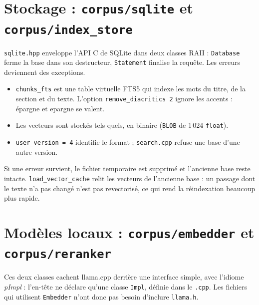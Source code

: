 \documentclass[11pt,a4paper]{article}
\newcommand{\fichier}[1]{\texttt{#1}}
\begin{document}
\section{Stockage : \texttt{corpus/sqlite} et \texttt{corpus/index\_store}}

\fichier{sqlite.hpp} enveloppe l'API C de SQLite dans deux classes RAII : \texttt{Database} ferme la base dans son destructeur, \texttt{Statement} finalise la requête. Les erreurs deviennent des exceptions.


\begin{itemize}
  \item \texttt{chunks\_fts} est une table virtuelle FTS5 qui indexe les mots du titre, de la section et du texte. L'option \texttt{remove\_diacritics 2} ignore les accents : \og épargne \fg{} et \og epargne \fg{} se valent.
  \item Les vecteurs sont stockés tels quels, en binaire (\texttt{BLOB} de 1\,024 \texttt{float}).
  \item \texttt{user\_version = 4} identifie le format ; \texttt{search.cpp} refuse une base d'une autre version.
\end{itemize}


Si une erreur survient, le fichier temporaire est supprimé et l'ancienne base reste intacte. \texttt{load\_vector\_cache} relit les vecteurs de l'ancienne base : un passage dont le texte n'a pas changé n'est pas revectorisé, ce qui rend la réindexation beaucoup plus rapide.

\section{Modèles locaux : \texttt{corpus/embedder} et \texttt{corpus/reranker}}

Ces deux classes cachent llama.cpp derrière une interface simple, avec l'idiome \emph{pImpl} : l'en-tête ne déclare qu'une classe \texttt{Impl}, définie dans le \texttt{.cpp}. Les fichiers qui utilisent \texttt{Embedder} n'ont donc pas besoin d'inclure \texttt{llama.h}.

\end{document}
